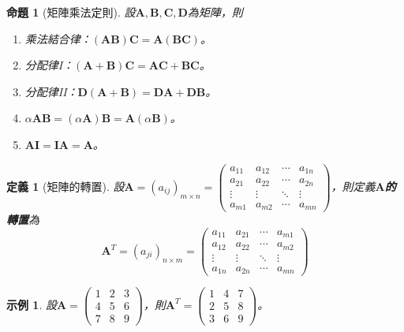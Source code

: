 \documentclass[12pt]{article}
\newtheorem{definition}{定義}
\newtheorem*{proposition}{命題}
\newtheorem*{example}{示例}
\begin{document}
    \begin{proposition}[矩陣乘法定則]
        設$\mathbf{A},\mathbf{B},\mathbf{C},\mathbf{D}$為矩陣，則\begin{enumerate}
            \item 乘法結合律：$(\mathbf{A}\mathbf{B})\mathbf{C}=\mathbf{A}(\mathbf{B}\mathbf{C})$。
            \item 分配律I：$(\mathbf{A}+\mathbf{B})\mathbf{C}=\mathbf{A}\mathbf{C}+\mathbf{B}\mathbf{C}$。
            \item 分配律II：$\mathbf{D}(\mathbf{A}+\mathbf{B})=\mathbf{D}\mathbf{A}+\mathbf{D}\mathbf{B}$。
            \item $\alpha\mathbf{A}\mathbf{B}=(\alpha\mathbf{A})\mathbf{B}=\mathbf{A}(\alpha\mathbf{B})$。
            \item $\mathbf{A}\mathbf{I}=\mathbf{I}\mathbf{A}=\mathbf{A}$。
        \end{enumerate}
    \end{proposition}
    \begin{definition}[矩陣的轉置]
        設$\mathbf{A}=(a_{ij})_{m\times n}=\begin{pmatrix}
            a_{11}&a_{12}&\cdots&a_{1n}\\
            a_{21}&a_{22}&\cdots&a_{2n}\\
            \vdots&\vdots&\ddots&\vdots\\
            a_{m1}&a_{m2}&\cdots&a_{mn}
        \end{pmatrix}$，則定義\textbf{$\mathbf{A}$的轉置}為$$\mathbf{A}^T=(a_{ji})_{n\times m}=\begin{pmatrix}
            a_{11}&a_{21}&\cdots&a_{m1}\\
            a_{12}&a_{22}&\cdots&a_{m2}\\
            \vdots&\vdots&\ddots&\vdots\\
            a_{1n}&a_{2n}&\cdots&a_{mn}
        \end{pmatrix}$$
    \end{definition}

    \begin{example}
        設$\mathbf{A}=\begin{pmatrix}
            1&2&3\\4&5&6\\7&8&9
        \end{pmatrix}$，則$\mathbf{A}^T=\begin{pmatrix}
            1&4&7\\2&5&8\\3&6&9
        \end{pmatrix}$。
    \end{example}
\end{document}
